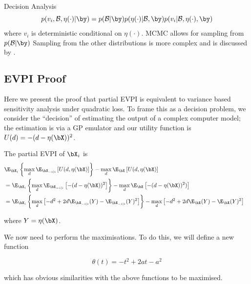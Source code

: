 \begin{chapter}{Decision Analysis \label{Ch:decision}}
\begin{equation*}
p(v_i, \mathcal{B}, \eta(\cdot)| \by) = p(\mathcal{B}|\by)p(\eta(\cdot)|\mathcal{B}, \by)p(v_i | \mathcal{B}, \eta(\cdot), \by)
\end{equation*}
where $v_i$ is deterministic conditional on $\eta(\cdot)$. MCMC allows for sampling from $p( \mathcal{B}| \by )$ Sampling from the other distributions is more complex and is discussed by \citet{Oakley2009}.



\subsection*{EVPI Proof \label{sec:evpi-proof}}

Here we present the proof that partial EVPI is equivalent to variance based sensitivity analysis under quadratic loss. To frame this as a decision problem, we consider the ``decision'' of estimating the output of a complex computer model; the estimation is via a GP emulator and our utility function is $U(d) = -(d - \eta(\bX))^2$.

The partial EVPI of $\bX_i$ is
\begin{align}
&\E_{\bX_i} \left\{ \max_{d} \E_{\bX_{-i|i}} \left[ U(d, \eta(\bX) \right] \right\} - \max_d \E_{\bX} \left[ U(d, \eta(\bX) \right]& \\
&=\E_{\bX_i} \left\{ \max_{d} \E_{\bX_{-i|i}} \left[ -(d - \eta(\bX))^2 \right] \right\} - \max_d \E_{\bX} \left[ -(d - \eta(\bX))^2) \right]\\
& = \E_{\bX_i} \left\{ \max_{d}  \left[ -d^2 + 2d \E_{\bX_{-i|i}}(Y) - \E_{\bX_{-i|i}}(Y)^2 \right] \right\} - \max_d \left[-d^2 + 2d \E_{\bX} (Y) - \E_{\bX} (Y)^2 \right]
\end{align}

where $Y = \eta(\bX)$.

We now need to perform the maximisations. To do this, we will define a new function

\begin{equation}
\theta(t) = -t^2 + 2at - a^2
\end{equation}

which has obvious similarities with the above functions to be maximised.


\end{chapter}

